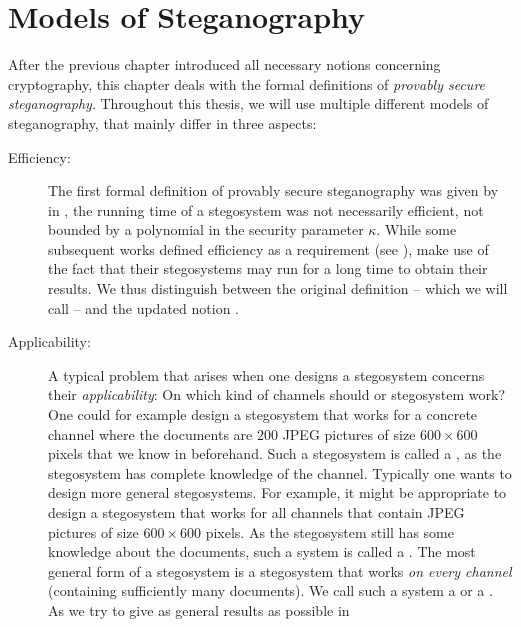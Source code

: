 \chapter{Models of Steganography}
\label{chap:models}
After the previous chapter introduced all necessary notions concerning
cryptography, this chapter deals with the formal definitions of
\emph{provably secure steganography}. Throughout this thesis, we will
use multiple different models of steganography, that mainly differ in
three aspects:
\begin{description}
\item[Efficiency:] The first formal definition of provably secure
  steganography was given by \citeauthor{hopper2009provably} in
  \cite{hopper2009provably}, the running time of a stegosystem was
  not necessarily efficient, \ie not bounded by a polynomial in the
  security parameter $\kappa$. While some subsequent works defined
  efficiency as a requirement (see \eg \cite{backes2005active,
    dedic2009lower}), \citeauthor{hopper2009provably} make use of the
  fact that their stegosystems may run for a long time to obtain their
  results. We thus distinguish between the original definition -- which
  we will call  -- and the
  updated notion . 
\item[Applicability:] A typical problem that arises when one designs a stegosystem
  concerns their \emph{applicability}: On which kind of channels should
  or stegosystem work? One could for example design a stegosystem that
  works for a concrete channel where the documents are $200$ \acs{JPEG}
  pictures of size $600\times 600$ pixels that we know in
  beforehand. 
Such a stegosystem is called a , as the stegosystem has complete knowledge of the
  channel. Typically one wants to design more general stegosystems. For
  example, it might be appropriate to design a stegosystem that works
  for all channels that contain \acs{JPEG} pictures of size $600\times
  600$ pixels. As the stegosystem still has some knowledge about the
  documents, such a system is called a . The most general form of a stegosystem is a
  stegosystem that works \emph{on every channel} (containing
  sufficiently many documents). We call such a system a
   or a . As we try to give as general results as possible in

\end{description}
